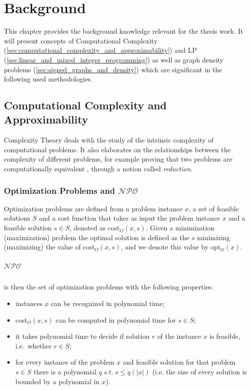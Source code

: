 \chapter{Background}
\label{ch:background}

This chapter provides the background knowledge relevant for the thesis work. It
will present concepts of Computational Complexity
(\autoref{sec:computational_complexity_and_approximability}) and \acrlong{LP}
(\autoref{sec:linear_and_mixed_integer_programming}) as well as graph density problems (\autoref{sec:signed_graphs_and_density}) which are significant in the
following used methodologies.

\section{Computational Complexity and \\Approximability}%
\label{sec:computational_complexity_and_approximability}

Complexity Theory deals with the study of the intrinsic complexity of
computational problems. It also elaborates on the relationships between
the complexity of different problems, for example proving that two problems are
computationally equivalent \cite{9780521884730}, through a notion called
\emph{reduction}.

\subsection{Optimization Problems and $\mathcal{NPO} $}%
\label{sub:optimization_problems}

Optimization problems are defined from a problem instance $x$, a set of
feasible solutions $S$ and a cost function that takes as input the problem
instance $x$ and a feasible solution $s \in S$, denoted as cost$_{O} (x, s) $.
Given a minimization (maximization) problem the optimal solution is defined as
the $s$ minimizing (maximizing) the value of cost$_{O} (x, s)$, and we denote
this value by opt$_{O} (x) $\cite{Trevisan2004}.

\paragraph{$\mathcal{NPO} $}%
\label{par:_npo_}

is then the set of optimization problems with the following properties:
\begin{itemize}
	\item instances $x$ can be recognized in polynomial time;
	\item cost$_{O} (x, s)$ can be computed in polynomial time for $s \in S$;
	\item it takes polynomial time to decide if solution $r$ of the instance
	      $x$ is feasible, i.e.\ whether $r \in S$;
	\item for every instance of the problem $x$
	      and feasible solution for that problem $s \in S$ there is a
	      polynomial $q \; s.t.  \; s \leq q(|x|)$ (i.e. the size of every
	      solution is bounded by a polynomial in $x$).
\end{itemize}

